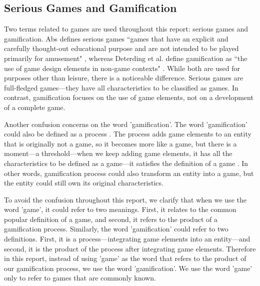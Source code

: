 \documentclass[12pt, a4paper]{report}
\begin{document}
\subsection{Serious Games and Gamification}
Two terms related to games are used throughout this report: serious games and gamification. Abs defines serious games ``games that have an explicit and carefully thought-out educational purpose and are not intended to be played primarily for amusement" \cite{abt1987serious}, whereas Deterding et al. define gamification as ``the use of game design elements in non-game contexts" \cite{deterding2011game}. While both are used for purposes other than leisure, there is a noticeable difference. Serious games are full-fledged games---they have all characteristics to be classified as games. In contrast, gamification focuses on the use of game elements, not on a development of a complete game. 

Another confusion concerns on the word 'gamification'. The word 'gamification' could also be defined as a process \cite{werbach2014re}. The process adds game elements to an entity that is originally not a game, so it becomes more like a game, but there is a moment---a threshold---when we keep adding game elements, it has all the characteristics to be defined as a game---it satisfies the definition of a game \cite{yohannis2014defining}. In other words, gamification process could also transform an entity into a game, but the entity could still own its original characteristics. 

To avoid the confusion throughout this report, we clarify that when we use the word 'game', it could refer to two meanings. First, it relates to the common popular definition of a game, and second, it refers to the product of a gamification process. Similarly, the word 'gamification' could refer to two definitions. First, it is a process---integrating game elements into an entity---and second, it is the product of the process after integrating game elements. Therefore in this report, instead of using 'game' as the word that refers to the product of our gamification process, we use the word 'gamification'. We use the word 'game' only to refer to games that are commonly known.        
\end{document}
